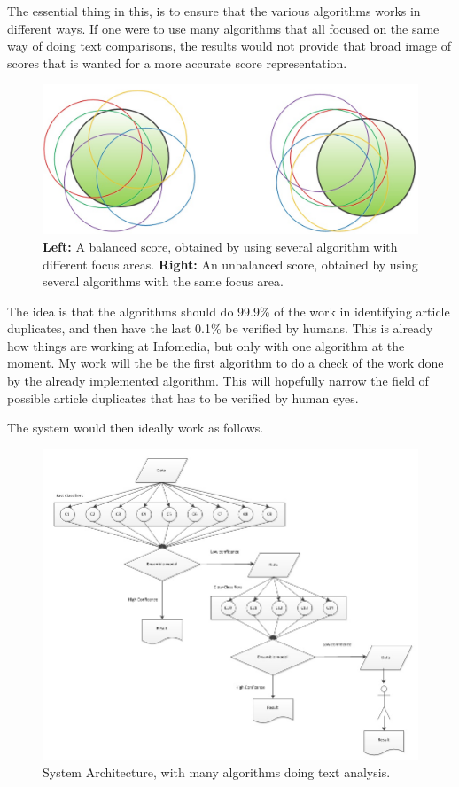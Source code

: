The essential thing in this, is to ensure that the various algorithms works in different ways. If one were to use many algorithms that all focused on the same way of doing text comparisons, the results would not provide that broad image of scores that is wanted for a more accurate score representation.

\begin{figure}
	\centering
	\includegraphics[scale=0.3]{figures/MultipleAlgoScores}
	\caption{\textbf{Left:} A balanced score, obtained by using several algorithm with different focus areas. \textbf{Right:} An unbalanced score, obtained by using several algorithms with the same focus area\cite{Slides}.}
	\label{MultipleAlgo}
\end{figure}

The idea is that the algorithms should do 99.9\% of the work in identifying article duplicates, and then have the  last 0.1\% be verified by humans. This is already how things are working at Infomedia, but only with one algorithm at the moment. My work will the be the first algorithm to do a check of the work done by the already implemented algorithm. This will hopefully narrow the field of possible article duplicates that has to be verified by human eyes.

The system would then ideally work as follows.

\begin{figure}[h]
	\centering
	\includegraphics[scale=0.5]{figures/SystemArchitecture}
	\caption{System Architecture, with many algorithms doing text analysis\cite{Slides}.}
	\label{Architecture}
\end{figure}

